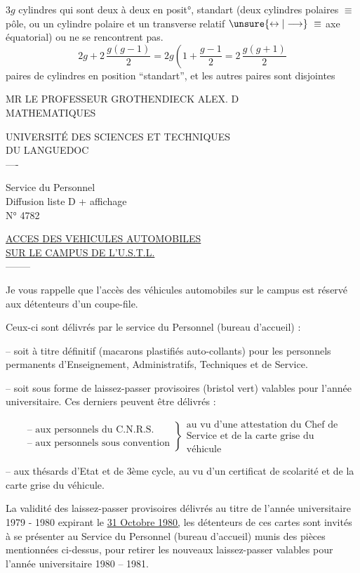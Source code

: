 $3g$ cylindres qui sont deux à deux en posit°, standart (deux cylindres polaires $\equiv$ pôle, ou un cylindre polaire et un transverse relatif $\unsure{\leftrightarrow|\longrightarrow}\ \equiv$ axe équatorial) ou ne se rencontrent pas.
\[
2g+2\,\frac{g(g-1)}2=2g\left(1+\frac{g-1}2\right. =2\,\frac{g(g+1)}2
\]
paires de cylindres en position ``standart'', et les autres paires sont disjointes

MR LE PROFESSEUR GROTHENDIECK ALEX. D\\
MATHEMATIQUES



UNIVERSITÉ DES SCIENCES ET TECHNIQUES\\
DU LANGUEDOC\\
----

Service du Personnel\\
Diffusion liste D + affichage\\
N° 4782

\uline{ACCES DES VEHICULES AUTOMOBILES}\\
\uline{SUR LE CAMPUS DE L'U.S.T.L.}\\
--------

Je vous rappelle que l'accès des véhicules automobiles sur le campus est réservé aux détenteurs d'un coupe-file.

Ceux-ci sont délivrés par le service du Personnel (bureau d'accueil) :

-- soit à titre définitif (macarons plastifiés auto-collants) pour les personnels permanents d'Enseignement, Administratifs, Techniques et de Service.

-- soit sous forme de laissez-passer provisoires (bristol vert) valables pour l'année universitaire. Ces derniers peuvent être délivrés :

\[
\left.\begin{array}{l}
\text{-- aux personnels du C.N.R.S.}\\
\text{-- aux personnels sous convention}
\end{array}\right\}
\begin{array}{l}
\text{au vu d'une attestation du Chef de}\\
\text{Service et de la carte grise du}\\
\text{véhicule}
\end{array}
\]

-- aux thésards d'Etat et de 3ème cycle, au vu d'un certificat de scolarité et de la carte grise du véhicule.

La validité des laissez-passer provisoires délivrés au titre de l'année universitaire 1979 - 1980 expirant le \uline{31 Octobre 1980,} les détenteurs de ces cartes sont invités à se présenter au Service du Personnel (bureau d'accueil) munis des pièces mentionnées ci-dessus, pour retirer les nouveaux laissez-passer valables pour l'année universitaire 1980 -- 1981.

